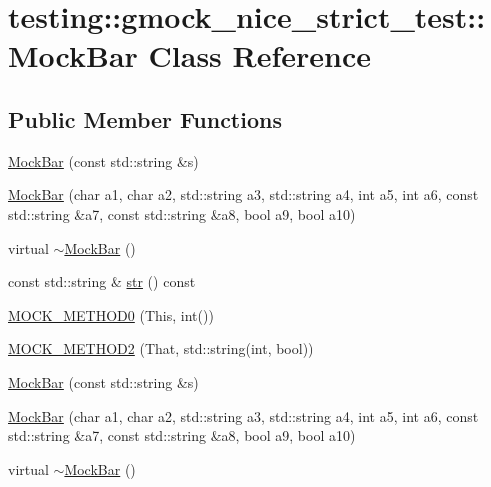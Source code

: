 \hypertarget{classtesting_1_1gmock__nice__strict__test_1_1_mock_bar}{}\section{testing\+::gmock\+\_\+nice\+\_\+strict\+\_\+test\+::Mock\+Bar Class Reference}
\label{classtesting_1_1gmock__nice__strict__test_1_1_mock_bar}
\subsection*{Public Member Functions}
\begin{DoxyCompactItemize}
\item 
\mbox{\hyperlink{classtesting_1_1gmock__nice__strict__test_1_1_mock_bar_abd4e7936dc389201ce608257f7a02584}{Mock\+Bar}} (const std\+::string \&s)
\item 
\mbox{\hyperlink{classtesting_1_1gmock__nice__strict__test_1_1_mock_bar_ad6b73066fdcdd71ac1add73ef56b53ef}{Mock\+Bar}} (char a1, char a2, std\+::string a3, std\+::string a4, int a5, int a6, const std\+::string \&a7, const std\+::string \&a8, bool a9, bool a10)
\item 
virtual \mbox{\hyperlink{classtesting_1_1gmock__nice__strict__test_1_1_mock_bar_a0559a3ecd9ecb4eebd5f519bf96bf03b}{$\sim$\+Mock\+Bar}} ()
\item 
const std\+::string \& \mbox{\hyperlink{classtesting_1_1gmock__nice__strict__test_1_1_mock_bar_adc0fb56c042e95e1a459bb007e813169}{str}} () const
\item 
\mbox{\hyperlink{classtesting_1_1gmock__nice__strict__test_1_1_mock_bar_a9aad688c2b1dc6b529b7c499e49e3a70}{M\+O\+C\+K\+\_\+\+M\+E\+T\+H\+O\+D0}} (This, int())
\item 
\mbox{\hyperlink{classtesting_1_1gmock__nice__strict__test_1_1_mock_bar_afa41d45dd7066f014f755f152ec16a73}{M\+O\+C\+K\+\_\+\+M\+E\+T\+H\+O\+D2}} (That, std\+::string(int, bool))
\item 
\mbox{\hyperlink{classtesting_1_1gmock__nice__strict__test_1_1_mock_bar_abd4e7936dc389201ce608257f7a02584}{Mock\+Bar}} (const std\+::string \&s)
\item 
\mbox{\hyperlink{classtesting_1_1gmock__nice__strict__test_1_1_mock_bar_ad6b73066fdcdd71ac1add73ef56b53ef}{Mock\+Bar}} (char a1, char a2, std\+::string a3, std\+::string a4, int a5, int a6, const std\+::string \&a7, const std\+::string \&a8, bool a9, bool a10)
\item 
virtual \mbox{\hyperlink{classtesting_1_1gmock__nice__strict__test_1_1_mock_bar_a0559a3ecd9ecb4eebd5f519bf96bf03b}{$\sim$\+Mock\+Bar}} ()

\end{DoxyCompactItemize}
